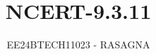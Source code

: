 \documentclass[journal]{IEEEtran}
\begin{document}

\vspace{3cm}

\title{NCERT-9.3.11}
\author{EE24BTECH11023 - RASAGNA}

{\let\newpage\relax\maketitle}

\renewcommand{\thefigure}{\theenumi}
\renewcommand{\thetable}{\theenumi}
\setlength{\intextsep}{10pt} %


\renewcommand{\thetable}{\theenumi}
\end{document}
